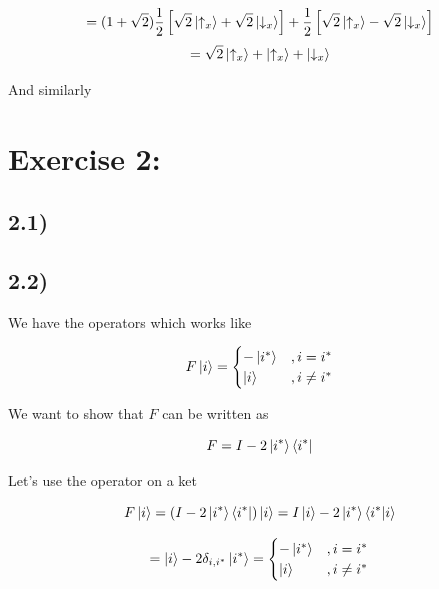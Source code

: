 \documentclass[a4paper,norsk, 10pt]{article}
\begin{document}
\begin{equation}
= (1+\sqrt{2})
\frac{1}{2}\left[
\sqrt{2}\ket{\uparrow_x}
+\sqrt{2}\ket{\downarrow_x}
\right]
+
\frac{1}{2}
\left[
\sqrt{2}\ket{\uparrow_x}
-\sqrt{2}\ket{\downarrow_x}
\right]
\end{equation}
\begin{equation}
= \sqrt{2}\ket{\uparrow_x} + \ket{\uparrow_x} + \ket{\downarrow_x}
\end{equation}

And similarly



\section{Exercise 2:}

\subsection{2.1)}\label{sec:21}


\subsection{2.2)}

We have the operators which works like

\begin{equation}
F\ket{i} = 
\begin{cases}
-\ket{i^*} & , i = i^* \\
\ket{i} & , i \neq i^*
\end{cases}
\end{equation}\label{eq:Feffect}

We want to show that $F$ can be written as

\begin{equation}
F = I - 2\ket{i^*}\bra{i^*}
\end{equation}\label{eq:Foperator}

Let's use the operator on a ket

\begin{equation}
F\ket{i} = (I - 2\ket{i^*}\bra{i^*})\ket{i} = I\ket{i} - 2\ket{i^*}\bra{i^*}\ket{i}
\end{equation}

\begin{equation}
= \ket{i} - 2\delta_{i,i^*}\ket{i^*} =
\begin{cases}
-\ket{i^*} & , i = i^* \\
\ket{i} & , i \neq i^*
\end{cases}
\end{equation}
\end{document}
